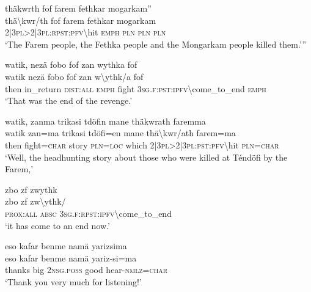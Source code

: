 \ea\label{ex:5:a1616}
thäkwrth fof farem fethkar mogarkam''\\
\gll thä{\textbackslash}kwr/th	fof	farem	fethkar	mogarkam\\
     2|3\textsc{pl}>2|3\textsc{pl}:\textsc{rpst}:\textsc{pfv}{\textbackslash}hit	\textsc{emph}	\textsc{pln}	\textsc{pln}	\textsc{pln}\\
\glt `The Farem people, the Fethka people and the Mongarkam people killed them.'''
\z

\ea\label{ex:5:a1620}
watik, nezä fobo fof zan wythka fof\\
\gll watik	nezä	fobo	fof	zan	w{\textbackslash}ythk/a	fof\\
     then	in\_return	\textsc{dist}:\textsc{all}	\textsc{emph}	fight	3\textsc{sg}.\textsc{f}:\textsc{pst}:\textsc{ipfv}{\textbackslash}come\_to\_end	\textsc{emph}\\
\glt `That was the end of the revenge.'
\z

\ea\label{ex:5:a1621}
watik, zanma trikasi tdöfin mane thäkwrath faremma\\
\gll watik	zan=ma	trikasi	tdöfi=en	mane	thä{\textbackslash}kwr/ath	farem=ma\\
     then	fight=\textsc{char}	story	\textsc{pln}=\textsc{loc}	which	2|3\textsc{pl}>2|3\textsc{pl}:\textsc{pst}:\textsc{pfv}{\textbackslash}hit	\textsc{pln}=\textsc{char}\\
\glt `Well, the headhunting story about those who were killed at Téndöfi by the Farem,'
\z

\ea\label{ex:5:a1624}
zbo zf zwythk\\
\gll zbo	zf	zw{\textbackslash}ythk/\\
     \textsc{prox}:\textsc{all}	\textsc{absc}	3\textsc{sg}.\textsc{f}:\textsc{rpst}:\textsc{ipfv}{\textbackslash}come\_to\_end\\
\glt `it has come to an end now.'
\z

\ea\label{ex:5:a1625}
eso kafar benme namä yarizsima\\
\gll eso	kafar	benme	namä	yariz-si=ma\\
     thanks	big	2\textsc{nsg}.\textsc{poss}	good	hear-\textsc{nmlz}=\textsc{char}\\
\glt `Thank you very much for listening!'
\z
